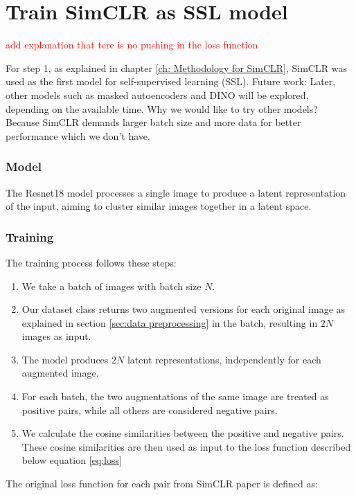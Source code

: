 \section{Train SimCLR as SSL model}

\textcolor{red}{add explanation that tere is no pushing in the loss function} 

For step 1, as explained in chapter \ref{ch: Methodology for SimCLR}, SimCLR was used as the first model for self-supervised learning (SSL). 
Future work: Later, other models such as masked autoencoders and DINO will be explored, depending on the available time.
Why we would like to try other models? Because SimCLR demands larger batch size and more data for better performance which we don't have.



\subsubsection{Model}
The Resnet18 \cite{he2015deepresiduallearningimage} model processes a single image to produce a latent representation of the input, aiming to cluster 
similar images together in a latent space. 

\subsubsection{Training }
The training process follows these steps:

\begin{enumerate}
    \item We take a batch of images with batch size $N$.
    
    \item Our dataset class returns two augmented versions for each original image as explained in section \ref{sec:data preprocessing} in the batch, 
    resulting in $2N$ images as input.

    \item The model produces $2N$ latent representations, independently for each augmented image.

    \item For each batch, the two augmentations of the same image are treated as positive pairs, while all others are considered negative pairs.

    \item We calculate the cosine similarities between the positive and negative pairs. These cosine similarities are then used as input to the loss
     function described below equation \ref{eq:loss}
\end{enumerate}
The original loss function for each pair from SimCLR paper \cite{chen2020simple} is defined as:


